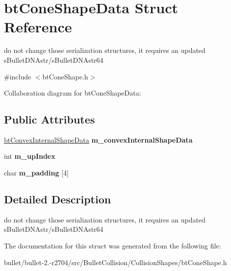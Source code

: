 \hypertarget{structbt_cone_shape_data}{\section{bt\+Cone\+Shape\+Data Struct Reference}
\label{structbt_cone_shape_data}
}


do not change those serialization structures, it requires an updated s\+Bullet\+D\+N\+Astr/s\+Bullet\+D\+N\+Astr64  




{\ttfamily \#include $<$bt\+Cone\+Shape.\+h$>$}



Collaboration diagram for bt\+Cone\+Shape\+Data\+:
\subsection*{Public Attributes}
\begin{DoxyCompactItemize}
\item 
\hypertarget{structbt_cone_shape_data_a5d57df88ebfa97bf1c3c3f148698f9bd}{\hyperlink{structbt_convex_internal_shape_data}{bt\+Convex\+Internal\+Shape\+Data} {\bfseries m\+\_\+convex\+Internal\+Shape\+Data}}\label{structbt_cone_shape_data_a5d57df88ebfa97bf1c3c3f148698f9bd}

\item 
\hypertarget{structbt_cone_shape_data_ab69c236550921a6fe7bde4dca157df07}{int {\bfseries m\+\_\+up\+Index}}\label{structbt_cone_shape_data_ab69c236550921a6fe7bde4dca157df07}

\item 
\hypertarget{structbt_cone_shape_data_affd08f8b7de4732131d686ce331c22f6}{char {\bfseries m\+\_\+padding} \mbox{[}4\mbox{]}}\label{structbt_cone_shape_data_affd08f8b7de4732131d686ce331c22f6}

\end{DoxyCompactItemize}


\subsection{Detailed Description}
do not change those serialization structures, it requires an updated s\+Bullet\+D\+N\+Astr/s\+Bullet\+D\+N\+Astr64 

The documentation for this struct was generated from the following file\+:\begin{DoxyCompactItemize}
\item 
bullet/bullet-\/2.-\/r2704/src/\+Bullet\+Collision/\+Collision\+Shapes/bt\+Cone\+Shape.\+h\end{DoxyCompactItemize}
